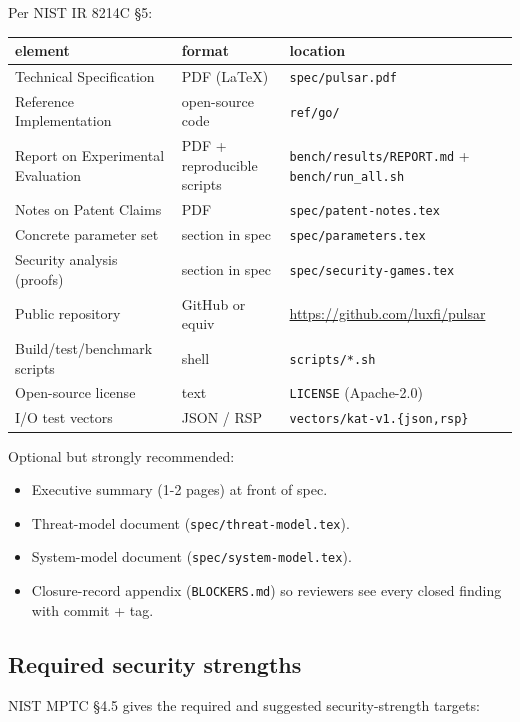 Per NIST IR 8214C \S5:

\begin{center}
\begin{tabular}{lll}
\toprule
element & format & location \\
\midrule
Technical Specification & PDF (LaTeX) & \texttt{spec/pulsar.pdf} \\
Reference Implementation & open-source code & \texttt{ref/go/} \\
Report on Experimental Evaluation & PDF + reproducible scripts &
  \texttt{bench/results/REPORT.md} + \texttt{bench/run\_all.sh} \\
Notes on Patent Claims & PDF & \texttt{spec/patent-notes.tex} \\
Concrete parameter set & section in spec & \texttt{spec/parameters.tex} \\
Security analysis (proofs) & section in spec & \texttt{spec/security-games.tex} \\
Public repository & GitHub or equiv & \url{https://github.com/luxfi/pulsar} \\
Build/test/benchmark scripts & shell & \texttt{scripts/*.sh} \\
Open-source license & text & \texttt{LICENSE} (Apache-2.0) \\
I/O test vectors & JSON / RSP & \texttt{vectors/kat-v1.\{json,rsp\}} \\
\bottomrule
\end{tabular}
\end{center}

Optional but strongly recommended:

\begin{itemize}[leftmargin=*, itemsep=0pt]
\item Executive summary (1-2 pages) at front of spec.
\item Threat-model document (\texttt{spec/threat-model.tex}).
\item System-model document (\texttt{spec/system-model.tex}).
\item Closure-record appendix (\texttt{BLOCKERS.md}) so reviewers
see every closed finding with commit + tag.
\end{itemize}

\subsection{Required security strengths}

NIST MPTC \S4.5 gives the required and suggested security-strength
targets:

